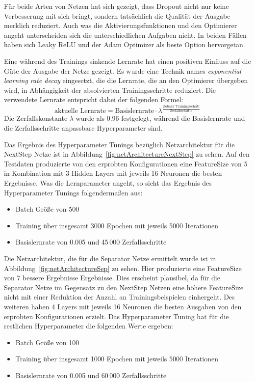 Für beide Arten von Netzen hat sich gezeigt, dass Dropout nicht nur keine Verbesserung mit sich bringt, sondern tatsächlich die Qualität der Ausgabe merklich reduziert.
Auch was die Aktivierungsfunktionen und den Optimierer angeht unterscheiden sich die unterschiedlichen Aufgaben nicht. 
In beiden Fällen haben sich Leaky ReLU und der Adam Optimizer als beste Option hervorgetan.

Eine während des Trainings sinkende Lernrate hat einen positiven Einfluss auf die Güte der Ausgabe der Netze gezeigt. 
Es wurde eine Technik names \textit{exponential learning rate decay} eingesetzt,
die die Lernrate, die an den Optimierer übergeben wird, in Abhängigkeit der absolvierten Trainingsschritte reduziert.   
Die verwendete Lernrate entspricht dabei der folgenden Formel:
\begin{equation*}
	\text{aktuelle Lernrate} = \text{Basislernrate} \cdot \lambda ^{\frac{\text{globaler Trainingsschritt}}{\text{Zerfallsschritte}}}
\end{equation*}
Die Zerfallskonstante \(\lambda\) wurde als 0.96 festgelegt, während die Basislernrate und die Zerfallsschritte anpassbare Hyperparameter sind.


Das Ergebnis des Hyperparameter Tunings bezüglich Netzarchitektur für die NextStep Netze ist in Abbildung~\ref{fig:netArchitectureNextStep} zu sehen.
Auf den Testdaten produzierte von den erprobten Konfigurationen eine FeatureSize von 5 in Kombination mit 3 Hidden Layers mit jeweils 16 Neuronen die besten Ergebnisse.
Was die Lernparameter angeht, so sieht das Ergebnis des Hyperparameter Tunings folgendermaßen aus:
\begin{itemize}
    \item Batch Größe von 500
    \item Training über insgesamt 3000 Epochen mit jeweils 5000 Iterationen
    \item Basislernrate von 0.005 und 45\,000 Zerfallsschritte
\end{itemize}

Die Netzarchitektur, die für die Separator Netze  ermittelt wurde ist in Abbildung~\ref{fig:netArchitectureSep} zu sehen.
Hier produzierte eine FeatureSize von 7 bessere Ergebnisse Ergebnisse.
Dies erscheint plausibel, da für die Separator Netze im Gegensatz zu den NextStep Netzen eine höhere FeatureSize nicht mit einer Reduktion der Anzahl an Trainingsbeispielen einhergeht.
Des weiteren haben 4 Layers mit jeweils 16 Neuronen die besten Ausgaben von den erprobten Konfigurationen erzielt.
Das Hyperparameter Tuning hat für die restlichen Hyperparameter die folgenden Werte ergeben:
\begin{itemize}
    \item Batch Größe von 100
    \item Training über insgesamt 1000 Epochen mit jeweils 5000 Iterationen
    \item Basislernrate von 0.005 und 60\,000 Zerfallsschritte
\end{itemize}



